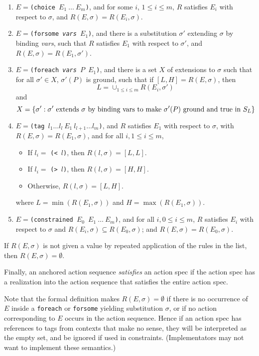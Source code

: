 \begin{enumerate}
\item $E=${\tt (choice $E_1\: \ldots\: E_m$)}, and for some $i$, $1\leq
i \leq m$, $R$ satisfies $E_i$ with respect to $\sigma$, and
$R(E,\sigma) = R(E_i,\sigma)$.

\item $E=${\tt (forsome {\it vars} $E_1$)}, and there is a substitution
$\sigma'$ extending $\sigma$ by binding {\it vars}, such that
$R$ satisfies $E_1$ with respect to $\sigma'$, and
$R(E,\sigma) = R(E_1,\sigma')$.

\item $E=${\tt (foreach {\it vars} $P$ $E_1$)}, and 
there is a  set $X$ of extensions to $\sigma$ such that for all
$\sigma'\in X$, $\sigma'(P)$ is ground, 
such that if $[L,H] = R(E,\sigma)$, then 
$$L= \cup_{1\leq i \leq m}R(E_i,\sigma')$$
and 
$$X=\{\sigma': \sigma' \mbox{\
extends\ } \sigma \mbox{\ by binding vars to make\ } \sigma'(P) 
\mbox{\ ground and true in\ }S_L\}$$


\item $E=${\tt (tag $l_1 \ldots l_l\: E_1\: l_{l+1} \ldots l_m$)}, and $R$ satisfies
$E_1$ with respect to $\sigma$, with 
$R(E,\sigma) = R(E_1, \sigma)$, and for all $i, 1 \leq i \leq m$,
\begin{itemize}
\item If $l_i=$ {\tt (< $l$)}, then $R(l,\sigma) = [L,L]$.
\item If $l_i=$ {\tt (> $l$)}, then $R(l,\sigma) = [H,H]$.
\item Otherwise, $R(l,\sigma) = [L,H]$.
\end{itemize}
where $L=\min(R(E_1,\sigma))$ and $H=\max(R(E_1,\sigma))$.

\item $E=${\tt (constrained $E_0$ $E_1 \: \ldots\: E_m$)}, and 
for all $i, 0 \leq i \leq m$, $R$ satisfies $E_i$ with respect to
$\sigma$ and $R(E_i,\sigma) \subseteq R(E_0,\sigma)$;
and $R(E,\sigma) = R(E_0,\sigma)$.

\end{enumerate}
If $R(E,\sigma)$ is not given a value by repeated application of the
rules in the list, then $R(E,\sigma)=\emptyset$.

Finally, an anchored action sequence {\em satisfies} an action spec if the
action spec has a realization into
the action sequence  that satisfies the entire action spec.

Note that the formal definition makes  $R(E,\sigma)=\emptyset$ 
if there is no occurrence of $E$ inside a {\tt foreach} or
{\tt forsome}
yielding substitution $\sigma$, or if no action corresponding to $E$
occurs in the action sequence.  Hence if an action spec has references
to tags from contexts that make no sense, they will be interpreted as
the empty set, and be ignored if used in constraints.
(Implementators may not want to implement these semantics.)

\newpage



%

%





 

